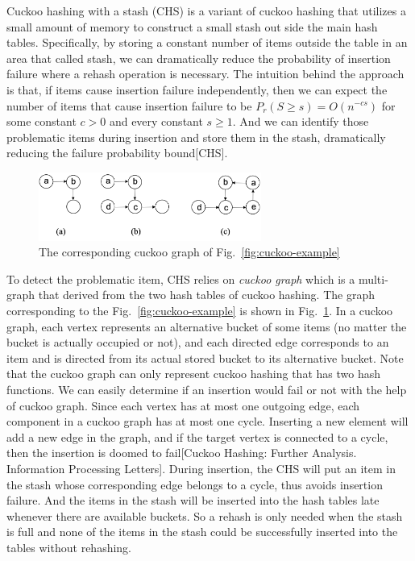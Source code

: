\documentclass[runningheads]{llncs}
\begin{document}
Cuckoo hashing with a stash (CHS) is a variant of cuckoo hashing that utilizes a small amount of memory to construct a small stash out side the main hash tables. Specifically, by storing a constant number of items outside the table in an area that called stash, we can dramatically reduce the probability of insertion failure where a rehash operation is necessary. The intuition behind the approach is that, if items cause insertion failure independently, then we can expect the number of items that cause insertion failure to be \textbf{$P_r$}$(S\geq s)=O(n^{-cs})$ for some constant $c>0$ and every constant $s\geq 1$. And we can identify those problematic items during insertion and store them in the stash, dramatically reducing the failure probability bound[CHS].

\begin{figure}
    \centering
    \includegraphics[width=0.65\textwidth]{cuckoo-graph.png}
    \caption{The corresponding cuckoo graph of Fig.~\ref{fig:cuckoo-example}
    } \label{fig:cuckoo-graph}
\end{figure}

To detect the problematic item, CHS relies on \textit{cuckoo graph} which is a multi-graph that derived from the two hash tables of cuckoo hashing. The graph corresponding to the Fig.~\ref{fig:cuckoo-example} is shown in Fig.~\ref{fig:cuckoo-graph}. In a cuckoo graph, each vertex represents an alternative bucket of some items (no matter the bucket is actually occupied or not), and each directed edge corresponds to an item and is directed from its actual stored bucket to its alternative bucket. Note that the cuckoo graph can only represent cuckoo hashing that has two hash functions. We can easily determine if an insertion would fail or not with the help of cuckoo graph. Since each vertex has at most one outgoing edge, each component in a cuckoo graph has at most one cycle. Inserting a new element will add a new edge in the graph, and if the target vertex is connected to a cycle, then the insertion is doomed to fail[Cuckoo Hashing: Further Analysis. Information Processing Letters]. During insertion, the CHS will put an item in the stash whose corresponding edge belongs to a cycle, thus avoids insertion failure. And the items in the stash will be inserted into the hash tables late whenever there are available buckets. So a rehash is only needed when the stash is full and none of the items in the stash could be successfully inserted into the tables without rehashing.
\end{document}
